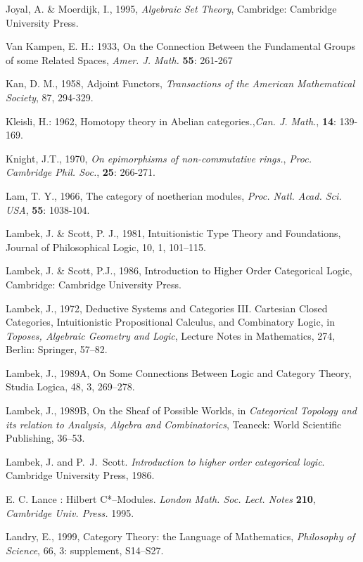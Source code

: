 \documentclass[12pt]{article}
\theoremstyle{plain}
\theoremstyle{definition}
\numberwithin{equation}{section}
\begin{document}
\begin{thebibliography}{9}
Joyal, A. \& Moerdijk, I., 1995, \emph{Algebraic Set Theory}, Cambridge: Cambridge University Press.  

Van Kampen, E. H.: 1933, On the Connection Between the Fundamental Groups of some Related Spaces, \emph{Amer. J. Math.} \textbf{55}: 261-267

Kan, D. M., 1958, Adjoint Functors, \emph{Transactions of the American Mathematical Society}, 87, 294-329.  

Kleisli, H.: 1962, Homotopy theory in Abelian categories.,{\em Can. J. Math.}, \textbf{14}: 139-169.

Knight, J.T., 1970, \emph{On epimorphisms of non-commutative rings.}, {\em Proc. Cambridge Phil. Soc.},
\textbf{25}: 266-271.

Lam, T. Y., 1966, The category of noetherian modules, {\em Proc. Natl. Acad. Sci. USA}, \textbf{55}: 1038-104.

Lambek, J. \& Scott, P. J., 1981, Intuitionistic Type Theory and Foundations, Journal of Philosophical Logic, 10, 1, 101--115. 

Lambek, J. \& Scott, P.J., 1986, Introduction to Higher Order Categorical Logic, Cambridge: Cambridge University Press. 

Lambek, J., 1972, Deductive Systems and Categories III. Cartesian Closed Categories, Intuitionistic Propositional Calculus, and Combinatory Logic, in {\em Toposes, Algebraic Geometry and Logic}, Lecture Notes in Mathematics, 274, Berlin: Springer, 57--82.  

Lambek, J., 1989A, On Some Connections Between Logic and Category Theory, Studia Logica, 48, 3, 269--278. 

Lambek, J., 1989B, On the Sheaf of Possible Worlds, in {\em Categorical Topology and its relation to Analysis, Algebra and Combinatorics}, Teaneck: World Scientific Publishing, 36--53. 
 
Lambek, J. and P.~J.~Scott. {\em Introduction to higher order categorical logic}. Cambridge University Press, 1986.

E. C. Lance :  Hilbert C*--Modules. \emph{London Math. Soc. Lect. Notes} \textbf{210}, \emph{Cambridge Univ. Press.} 1995.

Landry, E., 1999, Category Theory: the Language of Mathematics, {\em Philosophy of Science}, 66, 3: supplement, S14--S27. 


\end{thebibliography}
\end{document}
